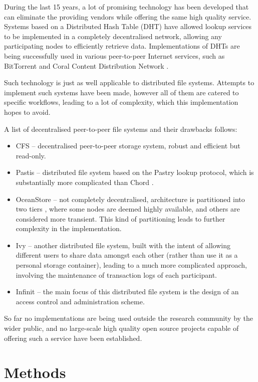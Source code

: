 \documentclass[8pt,a4paper]{article}
\begin{document}
During the last 15 years, a lot of promising technology has been developed that can eliminate the providing vendors while offering the same high quality service. 
Systems based on a Distributed Hash Table (DHT) have allowed lookup services to be implemented in a completely decentralised network, allowing any participating nodes to efficiently retrieve data. Implementations of DHTs are being successfully used in various peer-to-peer Internet services, such as BitTorrent and Coral Content Distribution Network \cite{coral}.

Such technology is just as well applicable to distributed file systems. Attempts to implement such systems have been made, however all of them are catered to specific workflows, leading to a lot of complexity, which this implementation hopes to avoid.

A list of decentralised peer-to-peer file systems and their drawbacks follows:

\begin{itemize}
  \item CFS \cite{cfs} -- decentralised peer-to-peer storage system, robust and efficient but read-only.
  \item Pastis \cite{pastis} -- distributed file system based on the Pastry lookup protocol, which is substantially more complicated than Chord \cite{chord}.
  \item OceanStore \cite{oceanstore} -- not completely decentralised, architecture is partitioned into two tiers \cite{towards}, where some nodes are deemed highly available, and others are considered more transient. This kind of partitioning leads to further complexity in the implementation.
  \item Ivy \cite{ivy} -- another distributed file system, built with the intent of allowing different users to share data amongst each other (rather than use it as a personal storage container), leading to a much more complicated approach, involving the maintenance of transaction logs of each participant.
  \item Infinit \cite{towards} -- the main focus of this distributed file system is the design of an access control and administration scheme. 
\end{itemize}

So far no implementations are being used outside the research community by the wider public, and no large-scale high quality open source projects capable of offering such a service have been established.

\section{Methods}
\end{document}
